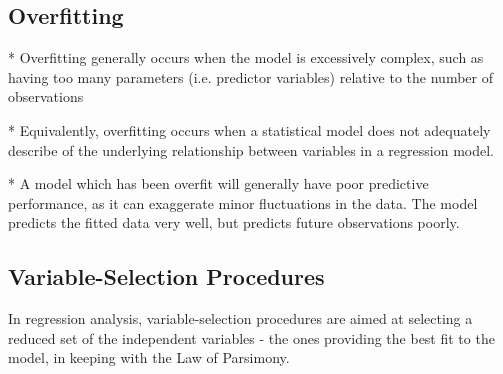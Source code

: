 \subsection*{Overfitting}

*  Overfitting generally occurs when the model is excessively complex, such as having too many parameters (i.e. predictor variables) relative to the number of observations

*  Equivalently, overfitting occurs when a statistical model does not adequately describe of the underlying relationship between variables in a regression model.

*  A model which has been overfit will generally have poor predictive performance, as it can exaggerate minor fluctuations in the data. The model predicts the fitted data very well, but predicts future observations poorly.




\subsection*{Variable-Selection Procedures}

In regression analysis, variable-selection procedures are aimed at selecting a reduced set of the independent variables - the ones providing the best fit to the model, in keeping with the Law of Parsimony.








